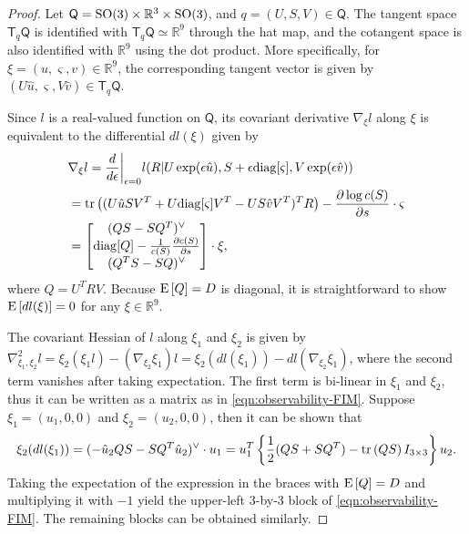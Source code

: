\begin{proof}
	Let $\mathsf{Q} = \mathrm{SO}(3)\times\mathbb{R}^3\times\mathrm{SO}(3)$, and $q=(U,S,V)\in\mathsf{Q}$.
	The tangent space $\mathsf{T}_q\mathsf{Q}$ is identified with $\mathsf{T}_q\mathsf{Q}\simeq \mathbb{R}^9$ through the hat map, and the cotangent space is also identified with $\mathbb{R}^9$ using the dot product.
	More specifically, for $\xi=(u,\varsigma,v)\in\mathbb{R}^9$, the corresponding tangent vector is given by $(U\hat u, \varsigma, V\hat v)\in\mathsf{T}_q \mathsf{Q}$. 
	
	Since $l$ is a real-valued function on $\mathsf{Q}$, its covariant derivative $\nabla_\xi l$ along $\xi$ is equivalent to the differential $dl(\xi)$ given by
	\begin{align*}
		&\nabla_\xi l = \frac{d}{d\epsilon}\bigg|_{\epsilon =0} l( R | U\exp(\epsilon\hat u), S+\epsilon\mathrm{diag}[\varsigma], V\exp(\epsilon\hat v))\\
		& = \mathrm{tr}\left( (U\hat uSV^T + U\mathrm{diag}[\varsigma]V^T - US\hat v V^T)^TR \right) - \frac{\partial \log c(S)}{\partial s}\cdot \varsigma \\
		& = 
		\begin{bmatrix}
			(QS-SQ^T)^\vee \\ 
			\mathrm{diag}[Q]-\frac{1}{c(S)} \frac{\partial c(S)}{\partial s} \\
			(Q^TS - SQ)^\vee
		\end{bmatrix}\cdot \xi,
	\end{align*}
	where $Q=U^TRV$.
	Because $\mathrm{E}\left[ Q \right] = D$ is diagonal, it is straightforward to show $\mathrm{E}\left[ dl(\xi) \right]=0$ for any $\xi\in\mathbb{R}^9$.
	
	The covariant Hessian of $l$ along $\xi_1$ and $\xi_2$ is given by $\nabla^2_{\xi_1,\xi_2} l = \xi_2(\xi_1 l) - (\nabla_{\xi_2}\xi_1) l = \xi_2 ( dl(\xi_1)) - dl(\nabla_{\xi_2} \xi_1)$,
	where the second term vanishes after taking expectation.
	The first term is bi-linear in $\xi_1$ and $\xi_2$, thus it can be written as a matrix as in \eqref{eqn:observability-FIM}.
	Suppose $\xi_1 = (u_1,0,0)$ and $\xi_2 =(u_2,0,0)$, then it can be shown that
	\begin{align*}
		\xi_2 (dl(\xi_1)) = (-\hat u_2 QS -SQ^T \hat u_2)^\vee \cdot u_1 = u_1^T \left\{\frac{1}{2}(QS+SQ^T) - \mathrm{tr}\left( QS \right)I_{3\times 3}\right\} u_2.
	\end{align*}
	Taking the expectation of the expression in the braces with $\mathrm{E}\left[ Q \right]=D$ and multiplying it with $-1$ yield the upper-left 3-by-3 block of \eqref{eqn:observability-FIM}.
	The remaining blocks can be obtained similarly.
\end{proof}


